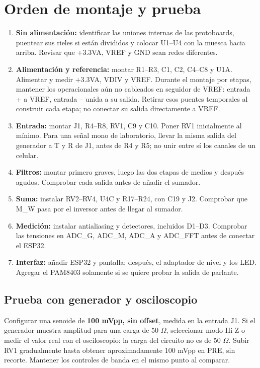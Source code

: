 \documentclass[10pt,a4paper]{article}
\begin{document}
\clearpage
\section{Orden de montaje y prueba}
\begin{enumerate}
\item \textbf{Sin alimentación:} identificar las uniones internas de las protoboards, puentear sus rieles si están divididos y colocar U1--U4 con la muesca hacia arriba. Revisar que +3.3VA, VREF y GND sean redes diferentes.
\item \textbf{Alimentación y referencia:} montar R1--R3, C1, C2, C4--C8 y U1A. Alimentar y medir +3.3VA, VDIV y VREF. Durante el montaje por etapas, mantener los operacionales aún no cableados en seguidor de VREF: entrada + a VREF, entrada -- unida a su salida. Retirar esos puentes temporales al construir cada etapa; no conectar su salida directamente a VREF.
\item \textbf{Entrada:} montar J1, R4--R8, RV1, C9 y C10. Poner RV1 inicialmente al mínimo. Para una señal mono de laboratorio, llevar la misma salida del generador a T y R de J1, antes de R4 y R5; no unir entre sí los canales de un celular.
\item \textbf{Filtros:} montar primero graves, luego las dos etapas de medios y después agudos. Comprobar cada salida antes de añadir el sumador.
\item \textbf{Suma:} instalar RV2--RV4, U4C y R17--R24, con C19 y J2. Comprobar que M\_W pasa por el inversor antes de llegar al sumador.
\item \textbf{Medición:} instalar antialiasing y detectores, incluidos D1--D3. Comprobar las tensiones en ADC\_G, ADC\_M, ADC\_A y ADC\_FFT antes de conectar el ESP32.
\item \textbf{Interfaz:} añadir ESP32 y pantalla; después, el adaptador de nivel y los LED. Agregar el PAM8403 solamente si se quiere probar la salida de parlante.
\end{enumerate}

\subsection{Prueba con generador y osciloscopio}
Configurar una senoide de \textbf{100 mVpp, sin offset}, medida en la entrada J1. Si el generador muestra amplitud para una carga de 50 \ensuremath{\Omega}, seleccionar modo Hi-Z o medir el valor real con el osciloscopio: la carga del circuito no es de 50 \ensuremath{\Omega}. Subir RV1 gradualmente hasta obtener aproximadamente 100 mVpp en PRE, sin recorte. Mantener los controles de banda en el mismo punto al comparar.
\end{document}
